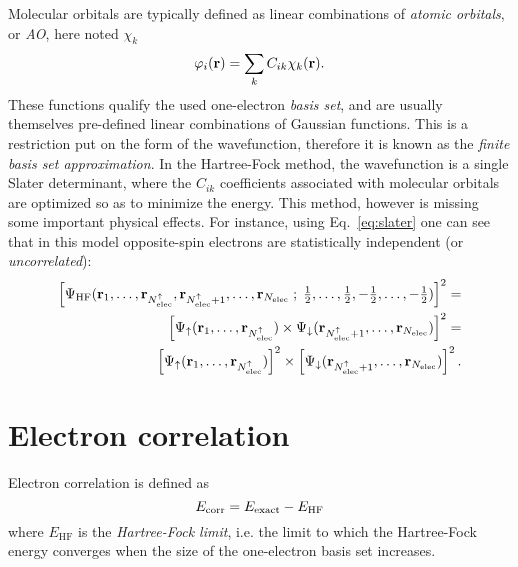 \documentclass[./thesis.tex]{subfiles}
\begin{document}
Molecular orbitals are typically defined as linear combinations of \emph{atomic orbitals}, or \emph{AO}, here noted $\chi_k$
\begin{equation}
 \varphi_i({\bf r}) = \sum_k C_{ik} \chi_k({\bf r}).
\label{eq:def_mo}
\end{equation}
These functions qualify the used one-electron \emph{basis set}, and are usually themselves pre-defined linear combinations of Gaussian functions. This is a restriction put on the form of the wavefunction, therefore it is known as the \emph{finite basis set approximation}.
In the Hartree-Fock method, the wavefunction is a single Slater determinant, where the $C_{ik}$ coefficients associated with molecular orbitals are optimized so as to minimize the energy.
This method, however is missing some important physical effects. For instance, using Eq.~\eqref{eq:slater} one can see that in this model opposite-spin electrons are statistically independent (or \emph{uncorrelated}):
\begin{equation}
\begin{split}
\left[ \Psi_\textrm{HF}({\bf r}_1,\dots,{\bf r}_{{N_\text{elec}^{\uparrow}}},{\bf r}_{{N_\text{elec}^{\uparrow}}+1},\dots,{\bf r}_{N_\text{elec}} \; ; \;
      \tfrac{1}{2},\dots,\tfrac{1}{2},-\tfrac{1}{2},\dots,-\tfrac{1}{2}) \right]^2 = \\
\left[ \Psi_\uparrow({\bf r}_1,\dots,{\bf r}_{{N_\text{elec}^{\uparrow}}}) \times \Psi_\downarrow({\bf r}_{{N_\text{elec}^{\uparrow}}+1},\dots,{\bf r}_{N_\text{elec}}) \right]^2 = \\
\left[ \Psi_\uparrow({\bf r}_1,\dots,{\bf r}_{{N_\text{elec}^{\uparrow}}}) \right]^2 \times \left[ \Psi_\downarrow({\bf r}_{{N_\text{elec}^{\uparrow}}+1},\dots,{\bf r}_{N_\text{elec}}) \right]^2.
\end{split}
\end{equation}

\section{Electron correlation}

Electron correlation is defined as\cite{Lowdin_1959}
\begin{equation}
E_\text{corr} = E_\text{exact} - E_\text{HF}
\end{equation}
where $E_\text{HF}$ is the \emph{Hartree-Fock limit}, i.e. the limit to which the Hartree-Fock energy converges when the size of the one-electron basis set increases.
\end{document}
